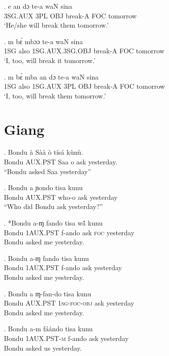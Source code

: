 \documentclass{assets/fieldnotes}
\begin{document}
\exg.
e         an    dɔ    te-a      waN   sina     \\
3SG.AUX   3PL   OBJ   break-A   FOC   tomorrow \\%
`He/she will break them tomorrow.'

\exg.
m     bɛ́     mbɔɔ              te-a      waN   sina     \\
1SG   also   1SG.AUX.3SG.OBJ   break-A   FOC   tomorrow \\%
`I, too, will break it tomorrow.'


\exg.
m     bɛ́     mba       an    dɔ    te-a      waN   sina     \\
1SG   also   1SG.AUX   3PL   OBJ   break-A   FOC   tomorrow \\%
`I, too, will break them tomorrow.'


\section{Giang}


\exg. Bondu à Sàà ò tísá kùnù.\\
Bondu AUX.PST Saa o ask yesterday.\\
``Bondu asked Saa yesterday''

\exg. Bondu a ɲondo tisa kunu\\
Bondu AUX.PST who-o ask yesterday\\
``Who did Bondu ask yesterday?''

\exg. *Bondu a-ɱ fando tisa wã́ kunu\\
Bondu 1\textsc{AUX.PST} f-ando ask \textsc{foc} yesterday\\
Bondu asked me yesterday. 

\exg. Bondu a-ɱ fando tisa kunu\\
Bondu 1\textsc{AUX.PST} f-ando ask yesterday\\
Bondu asked me yesterday. 

\exg. Bondu a ɱ-fan-do tisa kunu\\
Bondu \textsc{AUX.PST} 1\textsc{sg}-\textsc{foc}-\textsc{obj} ask yesterday\\
Bondu asked me yesterday.

\exg. Bondu a-m fáándo tisa kunu\\
Bondu 1\textsc{AUX.PST-m} f-ando ask yesterday\\
Bondu asked us yesterday.
\end{document}
